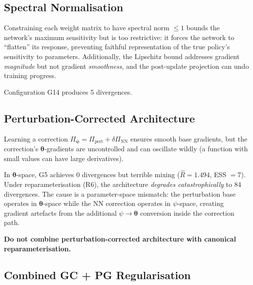 \documentclass[11pt,a4paper]{article}
\theoremstyle{definition}
\newcommand{\btheta}{\boldsymbol{\theta}}
\newcommand{\bpsi}{\boldsymbol{\psi}}
\begin{document}
	\subsection{Spectral Normalisation}
	\label{sec:specnorm}
	
	Constraining each weight matrix to have spectral norm $\leq 1$ bounds the network's maximum sensitivity but is too restrictive: it forces the network to ``flatten'' its response, preventing faithful representation of the true policy's sensitivity to parameters.
	Additionally, the Lipschitz bound addresses gradient \emph{magnitude} but not gradient \emph{smoothness}, and the post-update projection can undo training progress.
	
	Configuration G14 produces 5 divergences.
	
	\subsection{Perturbation-Corrected Architecture}
	\label{sec:pert_corrected}
	
	Learning a correction $\Pi_{\bpsi} = \Pi_{\mathrm{pert}} + \delta\Pi_{\mathrm{NN}}$ ensures smooth base gradients, but the correction's $\btheta$-gradients are uncontrolled and can oscillate wildly (a function with small values can have large derivatives).
	
	In $\btheta$-space, G5 achieves 0 divergences but terrible mixing ($\hat{R} = 1.494$, ESS $= 7$).
	Under reparameterisation (R6), the architecture \emph{degrades catastrophically} to 84 divergences.
	The cause is a parameter-space mismatch: the perturbation base operates in $\btheta$-space while the NN correction operates in $\psi$-space, creating gradient artefacts from the additional $\psi \to \btheta$ conversion inside the correction path.
	
	\textbf{Do not combine perturbation-corrected architecture with canonical reparameterisation.}
	
	\subsection{Combined GC + PG Regularisation}
	\label{sec:gc_pg}
	
\end{document}
